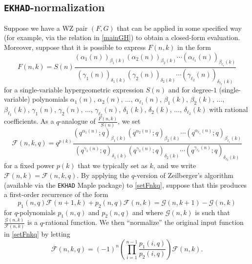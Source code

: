 \documentclass[12pt]{article}
\begin{document}
\subsection{{\tt EKHAD}-normalization}\label{EKHADoutline}
 Suppose we have a WZ pair $(F, G)$ that can be applied in some specified way (for example, via the relation in \eqref{mainGH}) 
 to obtain a closed-form evaluation. 
 Moreover, suppose that it is possible to express 
 $F(n, k)$ in the form 
 $$ F(n, k) 
 = S(n) \frac{ \left( \alpha_{1}(n) \right)_{\beta_{1}(k)} 
 \left( \alpha_{2}(n) \right)_{\beta_{2}(k)} \cdots 
 \left( \alpha_{\ell_1}(n) \right)_{\beta_{\ell_1}(k)} }{ 
 \left( \gamma_{1}(n) \right)_{\delta_{1}(k)} 
 \left( \gamma_{2}(n) \right)_{\delta_{2}(k)} \cdots 
 \left( \gamma_{\ell_2}(n) \right)_{\delta_{\ell_2}(k)} } $$ 
 for a single-variable hypergeometric expression $S(n)$
 and for degree-$1$ (single-variable)
 polynomials $\alpha_{1}(n)$, $\alpha_{2}(n)$, $\ldots$, $\alpha_{\ell_1}(n)$, 
 $\beta_{1}(k)$, $\beta_{2}(k)$, $\ldots$, $\beta_{\ell_1}(k)$, 
 $\gamma_{1}(n)$, $\gamma_{2}(n)$, $\ldots$, $\gamma_{\ell_{2}}(n)$, 
 $\delta_{1}(k)$, $\delta_{2}(k)$, $\ldots$, $\delta_{\ell_{2}}(k)$ 
 with rational coefficients. As a $q$-analogue of 
 $\frac{F(n, k)}{S(n)}$, we set 
\begin{equation}\label{setFnkq}
 \mathscr{F}(n, k, q) = 
 q^{p(k)} \frac{ \left( q^{\alpha_{1}(n)}; q \right)_{\beta_{1}(k)} 
 \left( q^{\alpha_{2}(n)}; q \right)_{\beta_{2}(k)} \cdots 
 \left( q^{\alpha_{\ell_1}(n)}; q \right)_{\beta_{\ell_1}(k)} }{ 
 \left( q^{\gamma_1(n)}; q \right)_{\delta_1(k)} 
 \left( q^{\gamma_2(n)}; q \right)_{\delta_2(k)} 
 \cdots \left( q^{\gamma_{\ell_2}(n)}; q \right)_{\delta_{\ell_2}(k)}}
\end{equation}
 for a fixed power $p(k)$ that we typically set as $k$, 
 and we write $\mathscr{F}(n, k) = \mathscr{F}(n, k, q)$. 
 By applying the $q$-version of Zeilberger's algorithm (available via the {\tt EKHAD} Maple package) to 
 \eqref{setFnkq}, suppose that this produces a first-order recurrence of the form 
 $$ p_{1}(n, q) \mathscr{F}(n+1, k) + p_{2}(n, q) \mathscr{F}(n, k) 
 = \mathscr{G}(n,k+1) - \mathscr{G}(n, k) $$
 for $q$-polynomials $p_{1}(n, q)$ and $p_2(n, q)$
 and where $\mathscr{G}(n, k)$ 
 is such that $\frac{\mathscr{G}(n, k)}{ \mathscr{F}(n, k) }$
 is a $q$-rational function. We then ``normalize'' the original input function in 
 \eqref{setFnkq} by letting 
\begin{equation}\label{lettingoverlinescrF}
 \overline{\mathscr{F}}(n, k, q) = (-1)^{n} 
 \left( \prod_{i=1}^{n-1} \frac{ p_{1}(i, q) }{ p_{2}(i, q) } \right) 
 \mathscr{F}(n, k). 
\end{equation}
\end{document}
